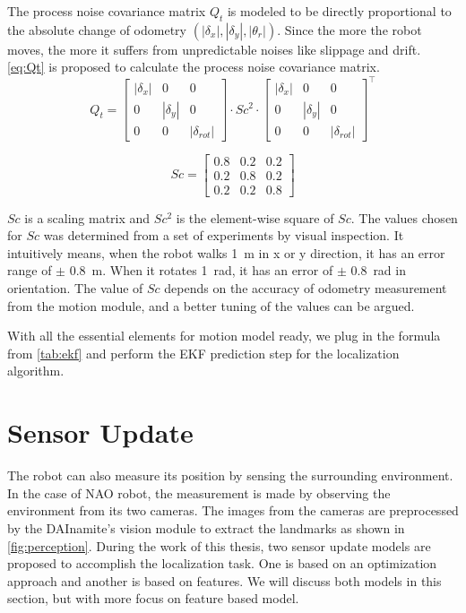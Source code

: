 The process noise covariance matrix $Q_t$ is modeled to be directly proportional to the absolute change of odometry $(|\delta_{x}|, |\delta_{y}|, |\theta_{r}|)$. Since the more the robot moves, the more it suffers from unpredictable noises like slippage and drift. \autoref{eq:Qt} is proposed to calculate the process noise covariance matrix.
\begin{equation}\label{eq:Qt} 
Q_t = 
\begin{bmatrix}
|\delta_x| & 0 & 0\\ 
0 &  |\delta_y|& 0\\ 
0 & 0 & |\delta_{rot}|
\end{bmatrix} 
\cdot
Sc^2 
\cdot
\begin{bmatrix}
|\delta_x| & 0 & 0\\ 
0 &  |\delta_y|& 0\\ 
0 & 0 & |\delta_{rot}|
\end{bmatrix}^\top
\end{equation}

\begin{equation}\label{eq:Sc} 
Sc = \begin{bmatrix}
0.8 & 0.2 & 0.2\\ 
0.2 &  0.8 & 0.2\\ 
0.2 & 0.2 & 0.8
\end{bmatrix}
\end{equation}

$Sc$ is a scaling matrix and $Sc^2$ is the element-wise square of $Sc$. The values chosen for $Sc$ was determined from a set of experiments by visual inspection. It intuitively means, when the robot walks \SI{1}{\meter} in x or y direction, it has an error range of $\pm$ \SI{0.8}{\meter}. When it rotates \SI{1}{\radian}, it has an error of $\pm$ \SI{0.8}{\radian} in orientation. The value of $Sc$ depends on the accuracy of odometry measurement from the motion module, and a better tuning of the values can be argued.

With all the essential elements for motion model ready, we plug in the formula from \autoref{tab:ekf} and perform the \gls{EKF} prediction step for the localization algorithm. %



\section{Sensor Update}\label{sec:sensor update}
The robot can also measure its position by sensing the surrounding environment. In the case of NAO robot, the measurement is made by observing the environment from its two cameras. The images from the cameras are preprocessed by the DAInamite's vision module to extract the landmarks as shown in \autoref{fig:perception}. During the work of this thesis, two sensor update models are proposed to accomplish the localization task. One is based on an optimization approach and another is based on features. We will discuss both models in this section, but with more focus on feature based model.

